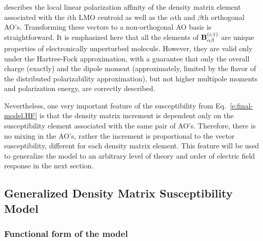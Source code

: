 \documentclass[aip,jcp,preprint,amsmath,amssymb,floatfix]{revtex4-1}
\begin{document}
describes the local linear polarization affinity 
of the density matrix element 
associated with the $i$th LMO centroid as well as the $\alpha$th and $\beta$th orthogonal AO's.
Transforming these vectors to a non\hyp{}orthogonal AO basis is straightforward.
It is emphasized here that all the elements of ${\bf B}_{\alpha\beta}^{(i;1)}$
are unique properties of electronically unperturbed molecule. 
However, they are valid only under the Hartree\hyp{}Fock
approximation, with a guarantee that only the overall charge (exactly) and the dipole moment (approximately,
limited by the flavor of the distributed polarizability approximation), 
but not higher multipole moments and polarization energy, are correctly described.

Nevertheless, one very important feature of the susceptibility from Eq.~\eqref{e:final-model.HF} is that
the density matrix increment is dependent only on the susceptibility element associated with the same
pair of AO's. Therefore, there is no mixing in the AO's, rather the increment is proportional to the 
vector susceptibility, different for each density matrix element. This feature will be used to
generalize the model to an arbitrary level of theory and order of electric field response in the next section.


\subsection{Generalized Density Matrix Susceptibility Model}

\subsubsection{Functional form of the model}
\end{document}
